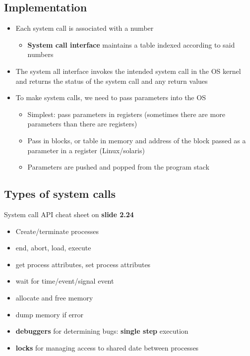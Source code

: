 \documentclass[12pt]{book}
\begin{document}
\subsection*{Implementation}

\begin{itemize}
    \item Each system call is associated with a number
    \begin{itemize}
        \item \textbf{System call interface} maintains a table indexed according to said numbers
    \end{itemize}
    \item The system all interface invokes the intended system call in the OS kernel and returns the status of the system call and any return values
    \item To make system calls, we need to pass parameters into the OS
    \begin{itemize}
        \item Simplest: pass parameters in registers (sometimes there are more parameters than there are registers)
        \item Pass in blocks, or table in memory and address of the block passed as a parameter in a register (Linux/solaris)
        \item Parameters are pushed and popped from the program stack
    \end{itemize} 
\end{itemize}

\subsection*{Types of system calls}
System call API cheat sheet on \textbf{slide 2.24}
\begin{itemize}
    \item Create/terminate processes
    \item end, abort, load, execute
    \item get process attributes, set process attributes
    \item wait for time/event/signal event
    \item allocate and free memory
    \item dump memory if error
    \item \textbf{debuggers} for determining bugs: \textbf{single step} execution
    \item \textbf{locks} for managing access to shared date between processes
\end{itemize}
\end{document}
